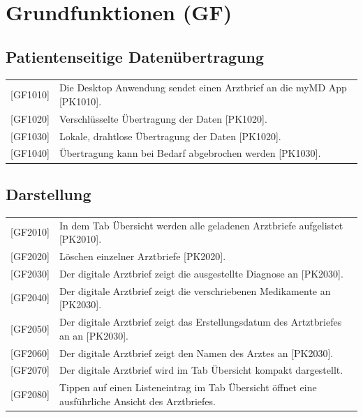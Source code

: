 \documentclass[a4paper]{scrreprt}
\begin{document}
\section{Grundfunktionen (GF)}
\subsection{Patientenseitige Datenübertragung}
\begin{tabular}{lll}
[GF1010]&  \multicolumn{2}{p{12cm}}{Die \gls{Desktop Anwendung} sendet einen Arztbrief an die myMD \gls{App} [PK1010].}\\
{[GF1020]} &  \multicolumn{2}{p{12cm}}{Verschlüsselte Übertragung der Daten [PK1020].}  \\
{[GF1030]} &  \multicolumn{2}{p{12cm}}{Lokale, drahtlose Übertragung der Daten [PK1020].}  \\
{[GF1040]} &  \multicolumn{2}{p{12cm}}{Übertragung kann bei Bedarf abgebrochen werden [PK1030].}  \\
\end{tabular}

\subsection{Darstellung}
\begin{tabular}{lll}
{[GF2010]}&  \multicolumn{2}{p{12cm}}{In dem \gls{Tab} Übersicht werden alle geladenen Arztbriefe aufgelistet [PK2010].} \\
{[GF2020]} &  \multicolumn{2}{p{12cm}}{Löschen einzelner Arztbriefe [PK2020].}  \\
{[GF2030]} &  \multicolumn{2}{p{12cm}}{Der digitale Arztbrief zeigt die ausgestellte Diagnose an [PK2030].}  \\
{[GF2040]} &  \multicolumn{2}{p{12cm}}{Der digitale Arztbrief zeigt die verschriebenen Medikamente an [PK2030].}  \\
{[GF2050]} &  \multicolumn{2}{p{12cm}}{Der digitale Arztbrief zeigt das Erstellungsdatum des Artztbriefes an an [PK2030].}  \\
{[GF2060]} &  \multicolumn{2}{p{12cm}}{Der digitale Arztbrief zeigt den Namen des Arztes an [PK2030].}  \\
{[GF2070]} &  \multicolumn{2}{p{12cm}}{Der digitale Arztbrief wird im \gls{Tab} Übersicht kompakt dargestellt.}  \\
{[GF2080]} &  \multicolumn{2}{p{12cm}}{Tippen auf einen Listeneintrag im \gls{Tab} Übersicht öffnet eine ausführliche Ansicht des Arztbriefes.}  \\
\end{tabular}
\end{document}
